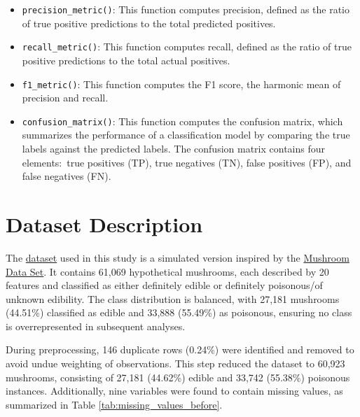 \documentclass{article}
\begin{document}
\begin{itemize}
    \item \texttt{precision\_metric()}: 
    This function computes precision, defined as the ratio of true positive predictions to the total predicted positives.

    \item \texttt{recall\_metric()}: 
    This function computes recall, defined as the ratio of true positive predictions to the total actual positives.

    \item \texttt{f1\_metric()}: 
    This function computes the F1 score, the harmonic mean of precision and recall.

    \item \texttt{confusion\_matrix()}: 
    This function computes the confusion matrix, which summarizes the performance of a classification model by comparing the true labels against the predicted labels. The confusion matrix contains four elements:\ true positives (TP), true negatives (TN), false positives (FP), and false negatives (FN).
\end{itemize}

\section{Dataset Description}

The \href{https://archive.ics.uci.edu/dataset/848/secondary+mushroom+dataset}{dataset} used in this study is a simulated version inspired by the \href{https://archive.ics.uci.edu/dataset/73/mushroom}{Mushroom Data Set}. It contains 61,069 hypothetical mushrooms, each described by 20 features and classified as either definitely edible or definitely poisonous/of unknown edibility. The class distribution is balanced, with 27,181 mushrooms (44.51\%) classified as edible and 33,888 (55.49\%) as poisonous, ensuring no class is overrepresented in subsequent analyses.

During preprocessing, 146 duplicate rows (0.24\%) were identified and removed to avoid undue weighting of observations. This step reduced the dataset to 60,923 mushrooms, consisting of 27,181 (44.62\%) edible and 33,742 (55.38\%) poisonous instances. Additionally, nine variables were found to contain missing values, as summarized in Table \ref{tab:missing_values_before}.
\end{document}
